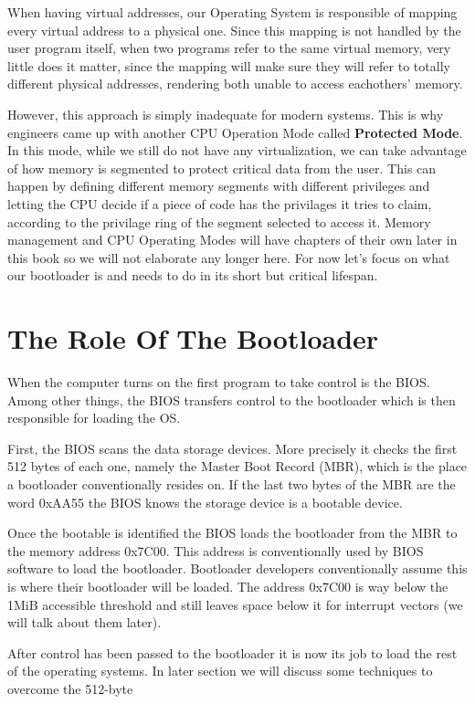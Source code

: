 When having virtual addresses, our Operating System is responsible of mapping every virtual address to a physical one. Since this 
mapping is not handled by the user program itself, when two programs refer to the same virtual memory, very little does it matter,
since the mapping will make sure they will refer to totally different physical addresses, rendering both unable to access eachothers'
memory.

However, this approach is simply inadequate for modern systems. This is why engineers came up with another CPU Operation Mode called
\textbf{Protected Mode}. In this mode, while we still do not have any virtualization, we can take advantage of how memory is segmented
to protect critical data from the user. This can happen by defining different memory segments with different privileges
and letting the CPU decide if a piece of code has the privilages it tries to claim, according to the privilage ring of the 
segment selected to access it. Memory management and CPU Operating Modes will have chapters of their own later in this book so
we will not elaborate any longer here. For now let's focus on what our bootloader is and needs to do in its short but critical lifespan. 

\section{The Role Of The Bootloader}

When the computer turns on the first program to take control is the BIOS. Among other things, the BIOS transfers control to the bootloader
which is then responsible for loading the OS. 

First, the BIOS scans the data storage devices. More precisely it checks the first 512 bytes of each one, namely the Master Boot Record 
(MBR), which is the place a bootloader conventionally resides on. If the last two bytes of the MBR are the word 0xAA55 the BIOS 
knows the storage device is a bootable device.

Once the bootable is identified the BIOS loads the bootloader from the MBR to the memory address 0x7C00. This address is conventionally
used by BIOS software to load the bootloader. Bootloader developers conventionally assume this is where their bootloader will 
be loaded. The address 0x7C00 is way below the 1MiB accessible threshold and still leaves space below it for interrupt vectors (we will
talk about them later).

After control has been passed to the bootloader it is now its job to load the rest of the operating systems. In later section we will 
discuss some techniques to overcome the 512-byte 